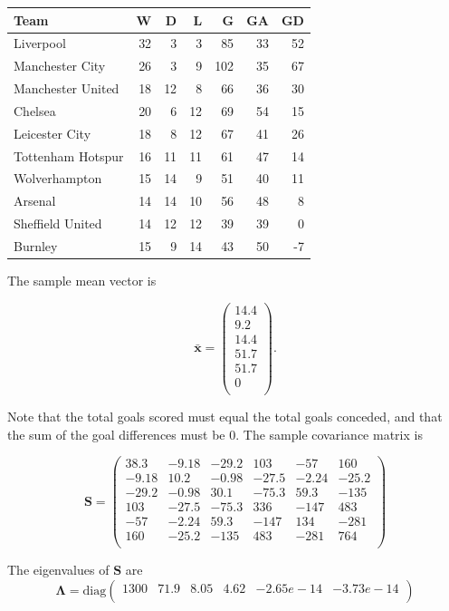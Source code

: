 \documentclass[]{book}
\theoremstyle{definition}
\theoremstyle{definition}
\theoremstyle{definition}
\theoremstyle{remark}
\begin{document}
\begin{tabular}{lrrrrrr}
\toprule
Team & W & D & L & G & GA & GD\\
\midrule
Liverpool & 32 & 3 & 3 & 85 & 33 & 52\\
Manchester City & 26 & 3 & 9 & 102 & 35 & 67\\
Manchester United & 18 & 12 & 8 & 66 & 36 & 30\\
Chelsea & 20 & 6 & 12 & 69 & 54 & 15\\
Leicester City & 18 & 8 & 12 & 67 & 41 & 26\\
\addlinespace
Tottenham Hotspur & 16 & 11 & 11 & 61 & 47 & 14\\
Wolverhampton & 15 & 14 & 9 & 51 & 40 & 11\\
Arsenal & 14 & 14 & 10 & 56 & 48 & 8\\
Sheffield United & 14 & 12 & 12 & 39 & 39 & 0\\
Burnley & 15 & 9 & 14 & 43 & 50 & -7\\
\bottomrule
\end{tabular}

The sample mean vector is

\[\bar{\mathbf x} =\begin{pmatrix}14.4 \\9.2 \\14.4 \\51.7 \\51.7 \\0 \\\end{pmatrix}.\]

Note that the total goals scored must equal the total goals conceded, and that the sum of the goal differences must be \(0\). The sample covariance matrix is

\begin{equation}
\mathbf S= \begin{pmatrix}38.3&-9.18&-29.2&103&-57&160 \\-9.18&10.2&-0.98&-27.5&-2.24&-25.2 \\-29.2&-0.98&30.1&-75.3&59.3&-135 \\103&-27.5&-75.3&336&-147&483 \\-57&-2.24&59.3&-147&134&-281 \\160&-25.2&-135&483&-281&764 \\\end{pmatrix}
\label{eq:PLES}
\end{equation}

The eigenvalues of \(\mathbf S\) are
\[\boldsymbol \Lambda= \text{diag}\begin{pmatrix}1300&71.9&8.05&4.62&-2.65e-14&-3.73e-14 \\\end{pmatrix}\]
\end{document}
